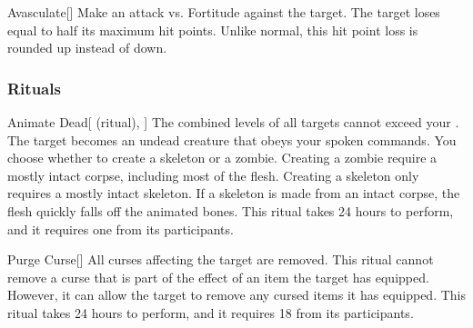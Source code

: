 \lowercase{\hypertarget{spell:Avasculate}{}}\label{spell:Avasculate}
\begin{freeability}[Rank 8]{\hypertarget{spell:Avasculate}{Avasculate}}[]
Make an attack vs. Fortitude against the target.
\hit The target loses  equal to half its maximum hit points.
Unlike normal, this hit point loss is rounded up instead of down.

\end{freeability}
\vspace{0.25em}



\subsubsection{Rituals}


\lowercase{\hypertarget{spell:Animate Dead}{}}\label{spell:Animate Dead}
\begin{attuneability}[Rank 3]{\hypertarget{spell:Animate Dead}{Animate Dead}}[ (ritual), ]
The combined levels of all targets cannot exceed your .
The target becomes an undead creature that obeys your spoken commands.
You choose whether to create a skeleton or a zombie.
Creating a zombie require a mostly intact corpse, including most of the flesh.
Creating a skeleton only requires a mostly intact skeleton.
If a skeleton is made from an intact corpse, the flesh quickly falls off the animated bones.
This ritual takes 24 hours to perform, and it requires one  from its participants.
\end{attuneability}
\vspace{0.25em}



\lowercase{\hypertarget{spell:Purge Curse}{}}\label{spell:Purge Curse}
\begin{freeability}[Rank 3]{\hypertarget{spell:Purge Curse}{Purge Curse}}[]
All curses affecting the target are removed.
This ritual cannot remove a curse that is part of the effect of an item the target has equipped.
However, it can allow the target to remove any cursed items it has equipped.
This ritual takes 24 hours to perform, and it requires 18  from its participants.
\end{freeability}
\vspace{0.25em}



